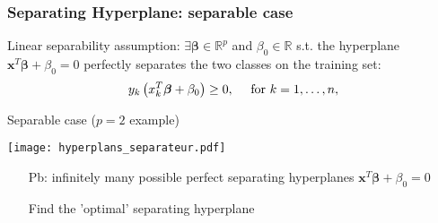 \documentclass[compress, smaller, serif, 9pt]{beamer}
\newcommand{\structuretext}[1]{{\usebeamercolor[fg]{structure} #1}}
\newcommand{\doigt}{\structuretext{\noindent \Pisymbol{pzd}{43}}}
\begin{document}
\begin{frame}
  \frametitle{Separating Hyperplane: separable case}
  

  \medskip
  
  \structuretext{Linear separability assumption:} 
  $\exists \boldsymbol{\beta}  \in \mathbb{R}^p$ and $\beta_0 \in \mathbb{R}$ s.t. the hyperplane 
  $\boldsymbol{x}^T \boldsymbol{\beta} + \beta_0 = 0$ 
  perfectly separates 
  the two classes on the training set:
  $$\begin{displaystyle}       y_k  \left(  x^T_k \boldsymbol{\beta} + \beta_0 \right) \ge 0, \quad \textrm{ for } k=1,\ldots,n,
  \end{displaystyle}$$

\begin{block}{Separable case ($p=2$ example)}
\begin{minipage}{.6\textwidth}
  \texttt{[image: hyperplans\_separateur.pdf]}
\end{minipage}
\begin{minipage}{.39\textwidth}
  \begin{itemize}
     \item[\alert{Pb:}] infinitely \alert{many} possible perfect \alert{separating hyperplanes} $\boldsymbol{x}^T\boldsymbol{\beta} + \beta_0=0$
     \item[\doigt] Find the 'optimal' separating hyperplane
  \end{itemize}
  \end{minipage}
\end{block}

\end{frame}
\end{document}
